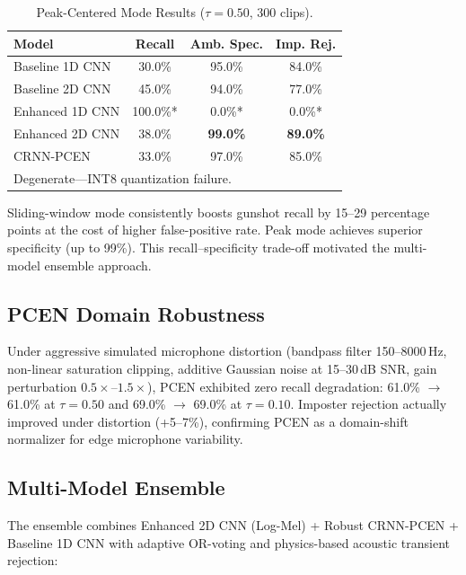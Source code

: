 \documentclass[conference]{IEEEtran}
\begin{document}
\begin{table}[!t]
\centering
\caption{Peak-Centered Mode Results ($\tau = 0.50$, 300 clips).}
\label{tab:peak_results}
\small
\begin{tabular}{lccc}
\toprule
\textbf{Model} & \textbf{Recall} & \textbf{Amb. Spec.} & \textbf{Imp. Rej.} \\
\midrule
Baseline 1D CNN & 30.0\% & 95.0\% & 84.0\% \\
Baseline 2D CNN & 45.0\% & 94.0\% & 77.0\% \\
Enhanced 1D CNN & 100.0\%* & 0.0\%* & 0.0\%* \\
Enhanced 2D CNN & 38.0\% & \textbf{99.0\%} & \textbf{89.0\%} \\
CRNN-PCEN & 33.0\% & 97.0\% & 85.0\% \\
\bottomrule
\multicolumn{4}{l}{\footnotesize *Degenerate---INT8 quantization failure.}
\end{tabular}
\end{table}

Sliding-window mode consistently boosts gunshot recall by 15--29 percentage points at the cost of higher false-positive rate. Peak mode achieves superior specificity (up to 99\%). This recall--specificity trade-off motivated the multi-model ensemble approach.

\subsection{PCEN Domain Robustness}
Under aggressive simulated microphone distortion (bandpass filter 150--8000\,Hz, non-linear saturation clipping, additive Gaussian noise at 15--30\,dB SNR, gain perturbation $0.5\times$--$1.5\times$), PCEN exhibited zero recall degradation: 61.0\% $\to$ 61.0\% at $\tau=0.50$ and 69.0\% $\to$ 69.0\% at $\tau=0.10$. Imposter rejection actually improved under distortion (+5--7\%), confirming PCEN as a domain-shift normalizer for edge microphone variability.

\subsection{Multi-Model Ensemble}
The ensemble combines Enhanced 2D CNN (Log-Mel) + Robust CRNN-PCEN + Baseline 1D CNN with adaptive OR-voting and physics-based acoustic transient rejection:
\end{document}
